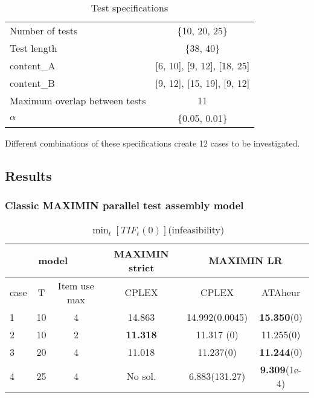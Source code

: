  \begin{table}[htbp]\label{tab:specATA}
 	\centering
\caption{Test specifications}

 	\begin{tabular}{ l  c }
\toprule
 		Number of tests & \{10, 20, 25\} \\
 		Test length   & \{38, 40\} \\
	 	content\_A   & [6, 10], [9, 12], [18, 25]\footnotemark  \\
 		content\_B  & [9, 12], [15, 19], [9, 12] \\
 		Maximum overlap between tests  & 11 \\
 		$\alpha$ & \{0.05, 0.01\}\\
\bottomrule
 	\end{tabular}
 \end{table}

Different combinations of these specifications create 12 cases to be investigated. 
\subsection{Results}
\subsubsection{Classic MAXIMIN parallel test assembly model}

\begin{table}[h]
	\centering
	\caption{ $\min_t\left[TIF_t(0)\right]$(infeasibility)}
	\begin{tabular}{l cc c cc}
		\toprule
		\multicolumn{3}{c}{model} & MAXIMIN strict & \multicolumn{2}{c}{MAXIMIN LR} \\		
		\midrule
		case & T & Item use max &CPLEX & CPLEX & ATAheur  \\
		\hline
		1 & 10 & 4& 14.863 & 14.992(0.0045) & \textbf{15.350}(0) \\
		2& 10 & 2& \textbf{11.318} & 11.317 (0) & 11.255(0) \\
		3& 20 & 4& 11.018 & 11.237(0) & \textbf{11.244}(0)  \\
		4&25 & 4&  No sol. & 6.883(131.27) & \textbf{9.309}(1e-4)\\
		\bottomrule
	\end{tabular}
\vspace{10pt}
\end{table}
